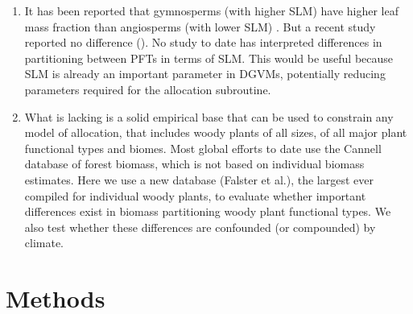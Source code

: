 \documentclass[a4paper]{article}
\begin{document}
\begin{enumerate}
\item It has been reported that gymnosperms (with higher SLM) have higher leaf mass fraction than angiosperms (with lower SLM) \cite{enquist_global_2002, mccarthy_consistency_2007, poorter_biomass_2012, sardans_tree_2013}. But a recent study reported no difference (\cite{wolf_allometric_2010}). No study to date has interpreted differences in partitioning between PFTs in terms of SLM. This would be useful because SLM is already an important parameter in DGVMs, potentially reducing parameters required for the allocation subroutine.

\item What is lacking is a solid empirical base that can be used to constrain any model of allocation, that includes woody plants of all sizes, of all major plant functional types and biomes. Most global efforts to date use the Cannell database of forest biomass, which is not based on individual biomass estimates. Here we use a new database (Falster et al.), the largest ever compiled for individual woody plants, to evaluate whether important differences exist in biomass partitioning woody plant functional types. We also test whether these differences are confounded (or compounded) by climate.
  


\end{enumerate}


\section{Methods}
\end{document}
